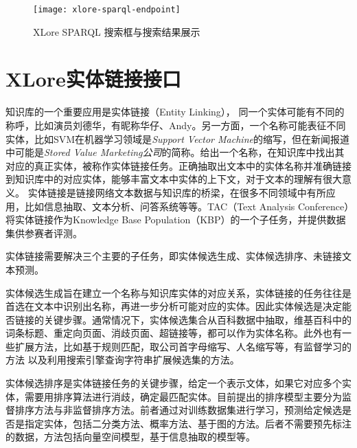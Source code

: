 \begin{figure}[ht]
  \centering
  \texttt{[image: xlore-sparql-endpoint]}
  \caption{XLore SPARQL 搜索框与搜索结果展示}
  \label{fig:xlore-sparql-endpoint}
\end{figure}

\section{XLore实体链接接口}
\label{sec5:entity-linking-api}

知识库的一个重要应用是实体链接（Entity Linking），
同一个实体可能有不同的称呼，比如演员刘德华，有昵称华仔、Andy。另一方面，一个名称可能表征不同实体，比如SVM在机器学习领域是\textit{Support Vector Machine}的缩写，但在新闻报道中可能是\textit{Stored Value Marketing公司}的简称。给出一个名称，在知识库中找出其对应的真正实体，被称作{\heiti 实体链接}任务。正确抽取出文本中的实体名称并准确链接到知识库中的对应实体，能够丰富文本中实体的上下文，对于文本的理解有很大意义。
实体链接是链接网络文本数据与知识库的桥梁，在很多不同领域中有所应用，比如信息抽取\cite{lin2012entity,nakashole2012patty}、文本分析\cite{gattani2013entity}、问答系统\cite{gattani2013entity}等等。TAC（Text Analysis Conference）将实体链接作为Knowledge Base Population（KBP）的一个子任务，并提供数据集供参赛者评测。

实体链接需要解决三个主要的子任务，即实体候选生成、实体候选排序、未链接文本预测。

{\heiti 实体候选生成}旨在建立一个名称与知识库实体的对应关系，实体链接的任务往往是首选在文本中识别出名称，再进一步分析可能对应的实体。因此实体候选是决定能否链接的关键步骤。通常情况下，实体候选集合从百科数据中抽取\cite{shen2012linden,shen2013linking}，维基百科中的词条标题、重定向页面、消歧页面、超链接等，都可以作为实体名称。此外也有一些扩展方法，比如基于规则匹配\cite{han2009nlpr_kbp,lehmann2010lcc}，取公司首字母缩写、人名缩写等，有监督学习的方法\cite{zhang2011entity} 以及利用搜索引擎查询字符串扩展候选集的方法\cite{dredze2010entity, monahan2011cross}。

{\heiti 实体候选排序}是实体链接任务的关键步骤，给定一个表示文体，如果它对应多个实体，需要用排序算法进行消歧，确定最匹配实体。目前提出的排序模型主要分为监督排序方法与非监督排序方法。前者通过对训练数据集进行学习，预测给定候选是否是指定实体，包括二分类方法\cite{lehmann2010lcc,monahan2011cross,chen2011collaborative}、概率方法\cite{han2011generative}、基于图的方法\cite{han2011collective}。后者不需要预先标注的数据，方法包括向量空间模型\cite{han2009nlpr_kbp}，基于信息抽取的模型\cite{varma2009iiit,gottipati2011linking}等。

